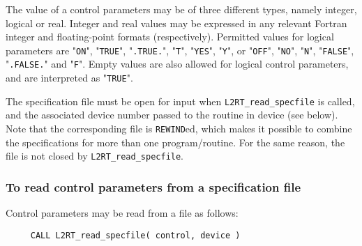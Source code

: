 \documentclass{galahad}
\newcommand{\packagename}{L2\-RT}
\begin{document}
The value of a control parameters may be of three different types, namely
integer, logical or real.
Integer and real values may be expressed in any relevant Fortran integer and
floating-point formats (respectively). Permitted values for logical
parameters are "{\tt ON}", "{\tt TRUE}", "{\tt .TRUE.}", "{\tt T}",
"{\tt YES}", "{\tt Y}", or "{\tt OFF}", "{\tt NO}",
"{\tt N}", "{\tt FALSE}", "{\tt .FALSE.}" and "{\tt F}".
Empty values are also allowed for
logical control parameters, and are interpreted as "{\tt TRUE}".

The specification file must be open for
input when {\tt \packagename\_read\_specfile}
is called, and the associated device number
passed to the routine in device (see below).
Note that the corresponding
file is {\tt REWIND}ed, which makes it possible to combine the specifications
for more than one program/routine.  For the same reason, the file is not
closed by {\tt \packagename\_read\_specfile}.

\subsubsection{To read control parameters from a specification file}
\label{readspec}

Control parameters may be read from a file as follows:
\hskip0.5in
\def\baselinestretch{0.8} {\tt \begin{verbatim}
     CALL L2RT_read_specfile( control, device )
\end{verbatim}}
\def\baselinestretch{1.0}
\end{document}
